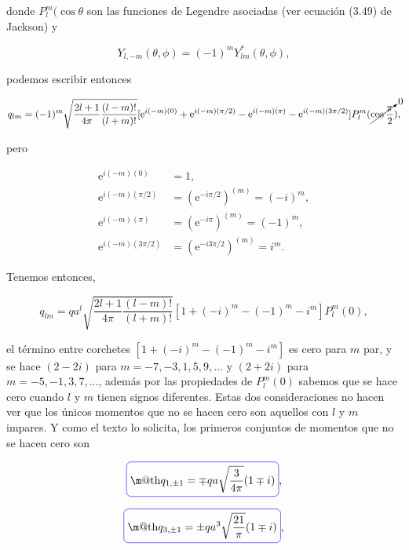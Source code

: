 \documentclass[a4paper,11pt]{article}
\makeatletter
\numberwithin{equation}{section}
\newcommand*{\boxcolor}{blue}
\renewcommand{\boxed}[1]{\textcolor{\boxcolor}{%
\tikz[baseline={([yshift=-1ex]current bounding box.center)}] \node [rectangle, minimum width=1ex,rounded corners,draw] {\normalcolor\m@th$\displaystyle#1$};}}
\newcommand{\euler}{\mathrm{e}}
\makeatother
\begin{document}
donde $P_l^m(\cos{\theta}$ son las funciones de Legendre asociadas (ver ecuación 
(3.49) de Jackson) y

\begin{equation}
 Y_{l,-m}(\theta,\phi) = (-1)^m Y^*_{lm}(\theta,\phi), 
\end{equation}

podemos escribir entonces 

\begin{equation*}
 q_{lm} = (-1)^m\sqrt{\frac{2l+1}{4\pi}\frac{(l-m)!}{(l+m)!}} [\euler^{i(-m)(0)} + 
 \euler^{i(-m)(\pi/2)} - \euler^{i(-m)(\pi)} - \euler^{i(-m)(3\pi/2)}] 
 P_l^m(\cancelto{0}{\cos{\frac{\pi}{2}}}),
\end{equation*}

pero 

\begin{align*}
 \euler^{i(-m)(0)} &= 1, \\
 \euler^{i(-m)(\pi/2)} &= (\euler^{-i\pi/2})^{(m)} = (-i)^m, \\
 \euler^{i(-m)(\pi)} &= (\euler^{-i\pi})^{(m)} = (-1)^m, \\
 \euler^{i(-m)(3\pi/2)} &= (\euler^{-i3\pi/2})^{(m)} = i^m.
\end{align*}

Tenemos entonces, 

\begin{equation}
 q_{lm} = qa^l\sqrt{\frac{2l+1}{4\pi}\frac{(l-m)!}{(l+m)!}}\left[1 + 
 (-i)^m - (-1)^m - i^m \right]P_l^m(0),
\end{equation}

el término entre corchetes $\left[1 +  (-i)^m - (-1)^m - i^m \right]$ es cero 
para $m$ par, y se hace $(2-2i)$ para $m = -7,-3,1,5,9,\dots$ y $(2+2i)$ para 
$m=-5,-1,3,7,\dots$, además por las propiedades de $P_l^m(0)$ sabemos que se 
hace cero cuando $l$ y $m$ tienen signos diferentes. Estas dos consideraciones 
no hacen ver que los únicos momentos que no se hacen cero son aquellos con 
$l$ y $m$ impares. Y como el texto lo solicita, los primeros conjuntos de momentos 
que no se hacen cero son 

\begin{equation}
 \boxed{q_{1,\pm 1} = \mp qa\sqrt{\frac{3}{4\pi}} (1 \mp i)},
\end{equation}

\begin{equation}
 \boxed{q_{3,\pm 1} = \pm qa^3\sqrt{\frac{21}{\pi}} (1 \mp i)},
\end{equation}
\end{document}

